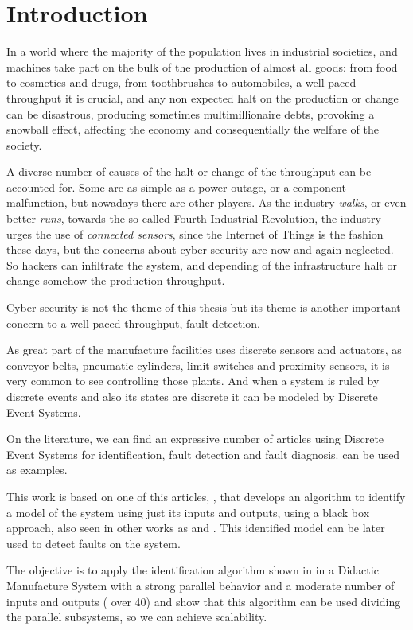 
\chapter{Introduction}
In a world where the majority of the population lives in industrial societies,
and machines take part on the bulk of the production of almost all goods: from
food to cosmetics and drugs, from toothbrushes to automobiles, 
a well-paced throughput it is crucial, and any non expected halt on the
production or change can be disastrous, producing sometimes multimillionaire debts,
provoking a snowball effect, affecting the economy and consequentially the welfare of the society.

A diverse number of causes of the halt or change of the throughput can be
accounted for. Some are as simple as a power outage, or a component malfunction,
but nowadays there are other players. As the industry \textsl{walks}, or even
better \textsl{runs}, towards the so called Fourth Industrial Revolution, the
industry urges the use of \textit{connected sensors}, since the Internet of
Things is the fashion these days, but the concerns about cyber security are now
and again neglected. So hackers can infiltrate the system, and depending of the
infrastructure halt or change somehow the production throughput.

Cyber security is not the theme of this thesis but its theme is another
important concern to a well-paced throughput, fault detection.

As great part of the manufacture facilities uses discrete sensors and actuators,
as conveyor belts, pneumatic cylinders, limit switches and proximity sensors, it
is very common to see \PLCs controlling those plants. And when a system is ruled
by discrete events and also its states are discrete it can be modeled by
Discrete Event Systems.

On the literature, we can find an expressive number of articles using Discrete
Event Systems for identification, fault detection and fault diagnosis.
\cite{veras2018distributed,cabral2017synchronous,kumar2014comments,klein2005fault}
can be used as examples.

This work is based on one of this articles, \cite{moreira2018enhanced}, that
develops an algorithm to identify a model of the system using just its inputs
and outputs, using a black box approach, also seen in other works as
\cite{klein2005fault} and \cite{roth2009fdi}. This identified model can be later
used to detect faults on the system.

The objective is to apply the identification algorithm shown in
\cite{moreira2018enhanced} in a Didactic Manufacture System with a strong
parallel behavior and a moderate number of inputs and outputs ( over 40) and
show that this algorithm can be used dividing the parallel subsystems, so we can
achieve scalability.


